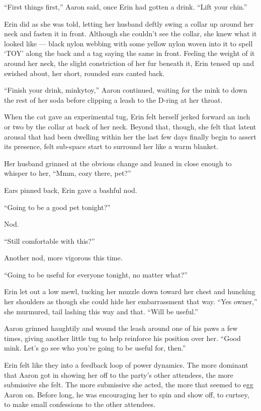 ``First things first,'' Aaron said, once Erin had gotten a drink. ``Lift your chin.''

Erin did as she was told, letting her husband deftly swing a collar up around her neck and fasten it in front. Although she couldn't see the collar, she knew what it looked like --- black nylon webbing with some yellow nylon woven into it to spell `TOY' along the back and a tag saying the same in front. Feeling the weight of it around her neck, the slight constriction of her fur beneath it, Erin tensed up and swished about, her short, rounded ears canted back.

``Finish your drink, minkytoy,'' Aaron continued, waiting for the mink to down the rest of her soda before clipping a leash to the D-ring at her throat.

When the cat gave an experimental tug, Erin felt herself jerked forward an inch or two by the collar at back of her neck. Beyond that, though, she felt that latent arousal that had been dwelling within her the last few days finally begin to assert its presence, felt sub-space start to surround her like a warm blanket.

Her husband grinned at the obvious change and leaned in close enough to whisper to her, ``Mmm, cozy there, pet?''

Ears pinned back, Erin gave a bashful nod.

``Going to be a good pet tonight?''

Nod.

``Still comfortable with this?''

Another nod, more vigorous this time.

``Going to be useful for everyone tonight, no matter what?''

Erin let out a low mewl, tucking her muzzle down toward her chest and hunching her shoulders as though she could hide her embarrassment that way. ``Yes owner,'' she murmured, tail lashing this way and that. ``Will be useful.''

Aaron grinned haughtily and wound the leash around one of his paws a few times, giving another little tug to help reinforce his position over her. ``Good mink. Let's go see who you're going to be useful for, then.''

Erin felt like they into a feedback loop of power dynamics. The more dominant that Aaron got in showing her off to the party's other attendees, the more submissive she felt. The more submissive she acted, the more that seemed to egg Aaron on. Before long, he was encouraging her to spin and show off, to curtsey, to make small confessions to the other attendees.

